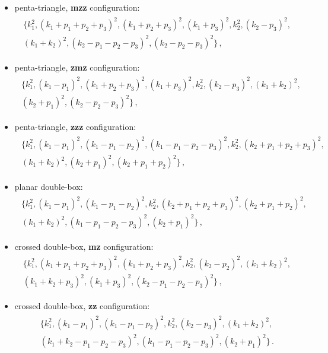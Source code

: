 \documentclass[main.tex]{subfiles}
\begin{document}
\begin{itemize}
	\item penta-triangle, \textbf{mzz} configuration:
		\begin{align} \begin{aligned}
			\big\{k_1^2,(k_1+p_1+p_2+p_3)^2,(k_1+p_2+p_3)^2,(k_1+p_3)^2,k_2^2,(k_2-p_3)^2,\\(k_1+k_2)^2,(k_2-p_1-p_2-p_3)^2,(k_2-p_2-p_3)^2\big\} \,,
		\end{aligned} \end{align}
	\item penta-triangle, \textbf{zmz} configuration:
		\begin{align} \begin{aligned}
		\big\{k_1^2,(k_1-p_1)^2,(k_1+p_2+p_3)^2,(k_1+p_3)^2,k_2^2,(k_2-p_3)^2,(k_1+k_2)^2,\\(k_2+p_1)^2,(k_2-p_2-p_3)^2 \big\} \,,
		\end{aligned} \end{align}
	\item penta-triangle, \textbf{zzz} configuration:
		\begin{align} \begin{aligned}
			\big\{k_1^2,(k_1-p_1)^2,(k_1-p_1-p_2)^2,(k_1-p_1-p_2-p_3)^2,k_2^2,(k_2+p_1+p_2+p_3)^2, \\ (k_1+k_2)^2,(k_2+p_1)^2,(k_2+p_1+p_2)^2\big\} \,,
		\end{aligned} \end{align}
	\item planar double-box:
		\begin{align} \begin{aligned}
			\big\{k_1^2,(k_1-p_1)^2,(k_1-p_1-p_2)^2,k_2^2,(k_2+p_1+p_2+p_3)^2,(k_2+p_1+p_2)^2, \\ (k_1+k_2)^2,(k_1-p_1-p_2-p_3)^2,(k_2+p_1)^2\big\} \,,
		\end{aligned} \end{align}
	\item crossed double-box, \textbf{mz} configuration:
		\begin{align} \begin{aligned}
			\big\{k_1^2,(k_1+p_1+p_2+p_3)^2,(k_1+p_2+p_3)^2,k_2^2,(k_2-p_2)^2,(k_1+k_2)^2,\\ (k_1+k_2+p_3)^2,(k_1+p_3)^2,(k_2-p_1-p_2-p_3)^2\big\} \,,
		\end{aligned} \end{align}
	\item crossed double-box, \textbf{zz} configuration:
		\begin{align} \begin{aligned}
			\big\{k_1^2,(k_1-p_1)^2,(k_1-p_1-p_2)^2,k_2^2,(k_2-p_3)^2,(k_1+k_2)^2, \\ (k_1+k_2-p_1-p_2-p_3)^2,(k_1-p_1-p_2-p_3)^2,(k_2+p_1)^2\big\} \,.
		\end{aligned} \end{align}
\end{itemize}
\end{document}
